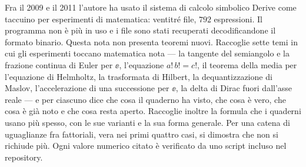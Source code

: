 Fra il 2009 e il 2011 l'autore ha usato il sistema di calcolo simbolico
Derive come taccuino per esperimenti di matematica: ventitr\'e file,
$792$ espressioni. Il programma non \`e pi\`u in uso e i file sono stati
recuperati decodificandone il formato binario. Questa nota non presenta
teoremi nuovi. Raccoglie sette temi in cui gli esperimenti toccano matematica
nota --- la tangente del semiangolo e la frazione continua di Euler per $\ee$,
l'equazione $a!\,b!=c!$, il teorema della media per l'equazione di
Helmholtz, la trasformata di Hilbert, la dequantizzazione di Maslov,
l'accelerazione di una successione per $\ee$, la delta di Dirac fuori
dall'asse reale --- e per ciascuno dice che cosa il quaderno ha visto, che
cosa \`e vero, che cosa \`e gi\`a noto e che cosa resta aperto. Raccoglie
inoltre la formula che i quaderni usano pi\`u spesso, con le sue varianti e la
sua forma generale. Per una
catena di uguaglianze fra fattoriali, vera nei primi quattro casi, si dimostra
che non si richiude pi\`u. Ogni valore numerico citato \`e verificato da
uno script incluso nel repository.
